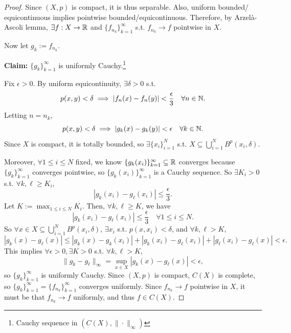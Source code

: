 \begin{proof}
    Since $(X, p)$ is compact, it is thus separable. Also, uniform bounded/\\equicontinuous 
    implies pointwise bounded/equicontinuous. Therefore, by Arzelà-Ascoli lemma, 
    $\exists f: X \to \mathbb{R}$ and $\{f_{n_k}\}_{k=1}^{\infty}$ s.t. $f_{n_k} \to f$ pointwise in $X$.
    
    \noindent Now let $g_k := f_{n_k}$. 
    
    \medskip
    \noindent \textbf{Claim:} $\{g_{k}\}_{k=1}^{\infty}$ is uniformly Cauchy.\footnote{Cauchy sequence in $(C(X), \| \cdot \|_{\infty} )$}
    
    \medskip
    \noindent Fix $\epsilon > 0$. By uniform equicontinuity, $\exists \delta > 0$ s.t. 
    \[
        p(x, y) < \delta \implies \left| f_n(x) - f_n(y)\right| < \frac{\epsilon}{3} 
        \quad \forall n \in \mathbb{N}.
    \]
    Letting $n = n_k$, 
    \[
        p(x, y) < \delta \implies \left| g_k(x) - g_k(y) \right| < \epsilon \quad \forall k \in \mathbb{N}.
    \]
    Since $X$ is compact, it is totally bounded, so $\exists \{x_{i}\}_{i=1}^{N}$ s.t. 
    $X \subseteq \bigcup_{i = 1}^N B^p(x_i, \delta)$.
    
    Moreover, $\forall 1\leq i \leq N$ fixed, we know $\{g_{k}(x_i)\}_{k=1}^{\infty} \subseteq \mathbb{R}$ 
    converges because $\{g_{k}\}_{k=1}^{\infty}$ converges pointwise, so $\{g_{k}(x_i)\}_{k=1}^{\infty}$
    is a Cauchy sequence. So $\exists K_i > 0$ s.t. $\forall k, \ell \geq K_i$, 
    \[
        \left| g_k(x_i) - g_\ell(x_i) \right| \leq \frac{\epsilon}{3}.
    \]
    Let $K := \max_{1 \leq i \leq N}{K_i}$. Then, $\forall k, \ell \geq K$, we have
    \[
        \left| g_k(x_i) - g_\ell(x_i) \right| \leq \frac{\epsilon}{3} \quad \forall 1 \leq i \leq N.
    \]
    So $\forall x \in X \subseteq \bigcup_{i = 1}^N B^p(x_i, \delta)$, 
    $\exists x_i$ s.t. $p(x, x_i) < \delta$, and $\forall k, \ell > K$,
    \[
        \left| g_k(x) - g_\ell(x) \right| \leq \left| g_k(x) - g_k(x_i) \right| + 
        \left| g_k(x_i) - g_\ell(x_i) \right| + \left| g_\ell(x_i) - g_\ell(x) \right| < \epsilon.
    \]
    This implies $\forall \epsilon > 0, \exists K > 0$ s.t. $\forall k, \ell > K$,
    \[
        \| g_k - g_\ell \|_{\infty} = \sup_{x \in X} \left| g_k(x) - g_\ell(x) \right| < \epsilon,
    \]
    so $\{g_{k}\}_{k=1}^{\infty}$ is uniformly Cauchy. Since $(X, p)$ is compact, 
    $C(X)$ is complete, so $\{g_{k}\}_{k=1}^{\infty} = \{f_{n_k}\}_{k=1}^{\infty}$ 
    converges uniformly. Since $f_{n_k} \to f$ pointwise in $X$, it must be that $f_{n_k} \to f$ 
    uniformly, and thus $f \in C(X)$.        
\end{proof}

